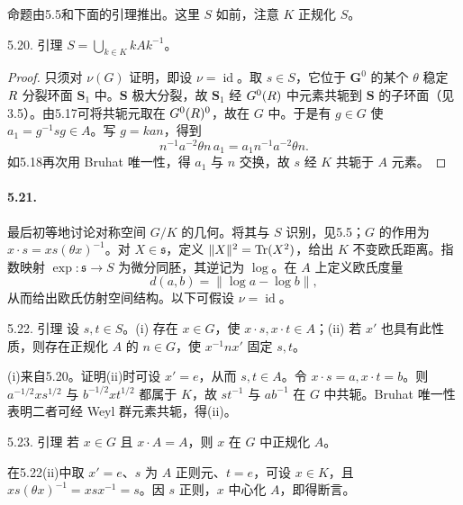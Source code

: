 命题由5.5和下面的引理推出。这里 $S$ 如前，注意 $K$ 正规化 $S$。
\begin{originaltheorem}{5.20. 引理}
$S=\bigcup_{k\in K}kAk^{-1}$。
\end{originaltheorem}
\begin{proof}
只须对 $\nu(G)$ 证明，即设 $\nu=\operatorname{id}$。取 $s\in S$，它位于 $\mathbf G^0$ 的某个 $\theta$ 稳定 $R$ 分裂环面 $\mathbf S_1$ 中。$\mathbf S$ 极大分裂，故 $\mathbf S_1$ 经 $G^0(R)$ 中元素共轭到 $\mathbf S$ 的子环面（见3.5）。由5.17可将共轭元取在 $G^0(R)^0$，故在 $G$ 中。于是有 $g\in G$ 使 $a_1=g^{-1}sg\in A$。写 $g=kan$，得到
\[
 n^{-1}a^{-2}\theta n\,a_1=a_1n^{-1}a^{-2}\theta n.
\]
如5.18再次用 Bruhat 唯一性，得 $a_1$ 与 $n$ 交换，故 $s$ 经 $K$ 共轭于 $A$ 元素。
\end{proof}
\paragraph*{5.21.} 最后初等地讨论对称空间 $G/K$ 的几何。将其与 $S$ 识别，见5.5；$G$ 的作用为 $x\cdot s=xs(\theta x)^{-1}$。对 $X\in\mathfrak s$，定义 $\|X\|^2=\operatorname{Tr}(X^2)$，给出 $K$ 不变欧氏距离。指数映射 $\exp:\mathfrak s\to S$ 为微分同胚，其逆记为 $\log$。在 $A$ 上定义欧氏度量
\[
 d(a,b)=\|\log a-\log b\|,
\]
从而给出欧氏仿射空间结构。以下可假设 $\nu=\operatorname{id}$。
\begin{originaltheorem}{5.22. 引理}
设 $s,t\in S$。(i) 存在 $x\in G$，使 $x\cdot s,x\cdot t\in A$；(ii) 若 $x'$ 也具有此性质，则存在正规化 $A$ 的 $n\in G$，使 $x^{-1}nx'$ 固定 $s,t$。
\end{originaltheorem}
(i)来自5.20。证明(ii)时可设 $x'=e$，从而 $s,t\in A$。令 $x\cdot s=a,x\cdot t=b$。则 $a^{-1/2}xs^{1/2}$ 与 $b^{-1/2}xt^{1/2}$ 都属于 $K$，故 $st^{-1}$ 与 $ab^{-1}$ 在 $G$ 中共轭。Bruhat 唯一性表明二者可经 Weyl 群元素共轭，得(ii)。
\begin{originaltheorem}{5.23. 引理}
若 $x\in G$ 且 $x\cdot A=A$，则 $x$ 在 $G$ 中正规化 $A$。
\end{originaltheorem}
在5.22(ii)中取 $x'=e$、$s$ 为 $A$ 正则元、$t=e$，可设 $x\in K$，且 $xs(\theta x)^{-1}=xsx^{-1}=s$。因 $s$ 正则，$x$ 中心化 $A$，即得断言。
